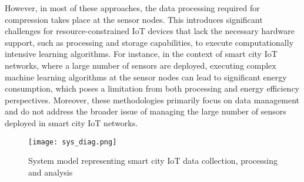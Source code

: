 However, in most of these approaches, the data processing required for compression takes place at the sensor nodes. This introduces significant challenges for resource-constrained IoT devices that lack the necessary hardware support, such as processing and storage capabilities, to execute computationally intensive learning algorithms. For instance, in the context of smart city IoT networks, where a large number of sensors are deployed, executing complex machine learning algorithms at the sensor nodes can lead to significant energy consumption, which poses a limitation from both processing and energy efficiency perspectives. Moreover, these methodologies primarily focus on data management and do not address the broader issue of managing the large number of sensors deployed in smart city IoT networks.

\label{seciii}
\begin{figure*}[h]
	\centering
	\texttt{[image: sys\_diag.png]}
	\caption{System model representing smart city IoT data collection, processing and analysis}
	\label{sys_dia}
\end{figure*}